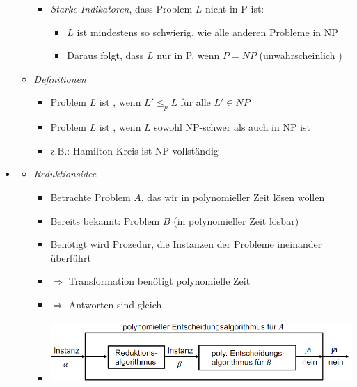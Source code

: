 \documentclass[
    12pt,
    a4paper,
    ngerman,
    color=3b,%
    marginpar=false,
    colorback=false,
    leqno,
]{tudaexercise}
\begin{document}
\begin{itemize}
\begin{itemize}
\begin{itemize}
                        \item \textit{Starke Indikatoren}, dass Problem $L$ nicht in P ist:
                              \begin{itemize}
                                  \item $L$ ist mindestens so schwierig, wie alle anderen Probleme in NP
                                  \item Daraus folgt, dass $L$ nur in P, wenn $P=NP$ (unwahrscheinlich )
                              \end{itemize}
                    \end{itemize}
              \item \textit{Definitionen}
                    \begin{itemize}
                        \item Problem $L$ ist , wenn $L' \leq_p L$ für alle $L' \in NP$
                        \item Problem $L$ ist , wenn $L$ sowohl NP-schwer als auch in NP ist
                        \item z.B.: Hamilton-Kreis ist NP-vollständig
                    \end{itemize}
          \end{itemize}

          \pagebreak

    \item {}
          \begin{itemize}
              \item \textit{Reduktionsidee}
                    \begin{itemize}
                        \item Betrachte Problem $A$, das wir in polynomieller Zeit lösen wollen
                        \item Bereits bekannt: Problem $B$ (in polynomieller Zeit lösbar)
                        \item Benötigt wird Prozedur, die Instanzen der Probleme ineinander überführt
                        \item[] $\Rightarrow$ Transformation benötigt polynomielle Zeit
                        \item[] $\Rightarrow$ Antworten sind gleich
                        \item[] \includegraphics[width=15cm]{pictures/reduktion1.PNG}
                    \end{itemize}


\end{itemize}
\end{itemize}
\end{document}
